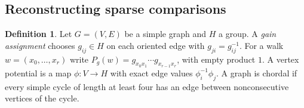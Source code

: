 \documentclass[11pt,reqno]{amsart}
\theoremstyle{definition}
\newtheorem{definition}[theorem]{Definition}
\theoremstyle{remark}
\numberwithin{equation}{section}
\begin{document}
\subsection{Reconstructing sparse comparisons}

\begin{definition}\label{m1:gains}
Let \(G=(V,E)\) be a simple graph and \(H\) a group. A
\emph{gain assignment} chooses \(g_{ij}\in H\) on each oriented edge
with \(g_{ji}=g_{ij}^{-1}\). For a walk \(w=(x_0,\ldots,x_r)\)
write \(P_g(w)=g_{x_0x_1}\cdots g_{x_{r-1}x_r}\), with empty product
\(1\). A vertex potential is a map \(\phi:V\to H\) with exact edge
values \(\phi_i^{-1}\phi_j\). A graph is chordal if every simple
cycle of length at least four has an edge between nonconsecutive
vertices of the cycle.
\end{definition}
\end{document}
